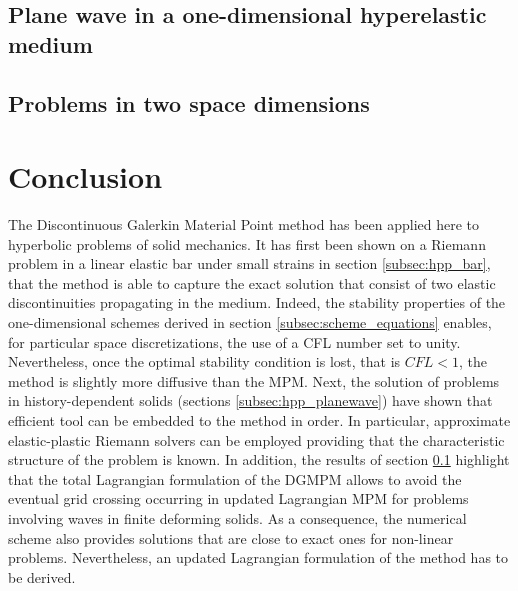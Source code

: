\subsection{Plane wave in a one-dimensional hyperelastic medium}
\label{subsec:he_planewave}



\subsection{Problems in two space dimensions}
\label{subsec:he_plate}






\section{Conclusion}
The Discontinuous Galerkin Material Point method has been applied here to hyperbolic problems of solid mechanics.
It has first been shown on a Riemann problem in a linear elastic bar under small strains in section \ref{subsec:hpp_bar}, that the method is able to capture the exact solution that consist of two elastic discontinuities propagating in the medium.
Indeed, the stability properties of the one-dimensional schemes derived in section \ref{subsec:scheme_equations} enables, for particular space discretizations, the use of a CFL number set to unity.
Nevertheless, once the optimal stability condition is lost, that is $CFL <1$, the method is slightly more diffusive than the MPM.
Next, the solution of problems in history-dependent solids (sections \ref{subsec:hpp_planewave}) have shown that efficient tool can be embedded to the method in order.
In particular, approximate elastic-plastic Riemann solvers can be employed providing that the characteristic structure of the problem is known.
In addition, the results of section \ref{subsec:he_planewave} highlight that the total Lagrangian formulation of the DGMPM allows to avoid the eventual grid crossing occurring in updated Lagrangian MPM for problems involving waves in finite deforming solids.
As a consequence, the numerical scheme also provides solutions that are close to exact ones for non-linear problems.
Nevertheless, an updated Lagrangian formulation of the method has to be derived. 

